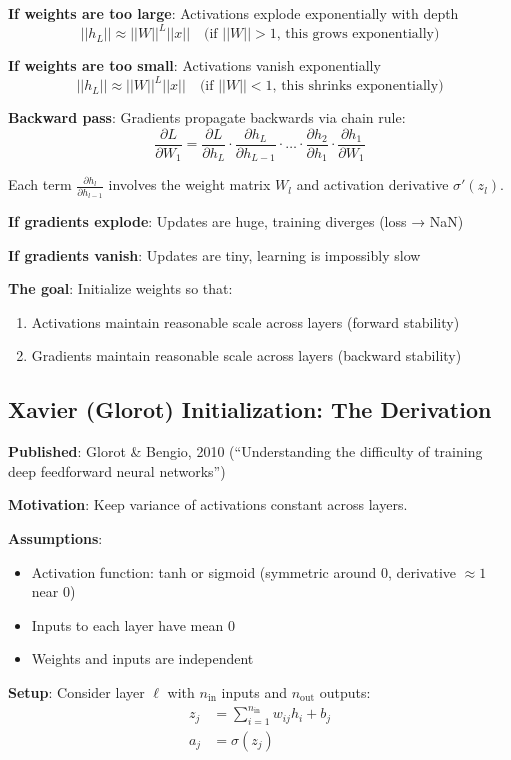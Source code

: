 \documentclass[11pt,oneside]{book}
\begin{document}
\textbf{If weights are too large}: Activations explode exponentially with depth
\[
||h_L|| \approx ||W||^L ||x|| \quad \text{(if } ||W|| > 1\text{, this grows exponentially)}
\]

\textbf{If weights are too small}: Activations vanish exponentially
\[
||h_L|| \approx ||W||^L ||x|| \quad \text{(if } ||W|| < 1\text{, this shrinks exponentially)}
\]

\textbf{Backward pass}: Gradients propagate backwards via chain rule:
\[
\frac{\partial L}{\partial W_1} = \frac{\partial L}{\partial h_L} \cdot \frac{\partial h_L}{\partial h_{L-1}} \cdot \ldots \cdot \frac{\partial h_2}{\partial h_1} \cdot \frac{\partial h_1}{\partial W_1}
\]

Each term $\frac{\partial h_l}{\partial h_{l-1}}$ involves the weight matrix $W_l$ and activation derivative $\sigma'(z_l)$.

\textbf{If gradients explode}: Updates are huge, training diverges (loss → NaN)

\textbf{If gradients vanish}: Updates are tiny, learning is impossibly slow

\textbf{The goal}: Initialize weights so that:
\begin{enumerate}
\item Activations maintain reasonable scale across layers (forward stability)
\item Gradients maintain reasonable scale across layers (backward stability)
\end{enumerate}

\subsection{Xavier (Glorot) Initialization: The Derivation}

\textbf{Published}: Glorot \& Bengio, 2010 (``Understanding the difficulty of training deep feedforward neural networks'')

\textbf{Motivation}: Keep variance of activations constant across layers.

\textbf{Assumptions}:
\begin{itemize}
\item Activation function: tanh or sigmoid (symmetric around 0, derivative $\approx 1$ near 0)
\item Inputs to each layer have mean 0
\item Weights and inputs are independent
\end{itemize}

\textbf{Setup}: Consider layer $\ell$ with $n_{\text{in}}$ inputs and $n_{\text{out}}$ outputs:
\begin{align*}
z_j &= \sum_{i=1}^{n_{\text{in}}} w_{ij} h_i + b_j \\
a_j &= \sigma(z_j)
\end{align*}
\end{document}
